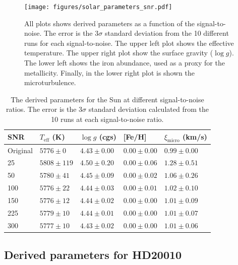 \documentclass{aa}
\begin{document}
\begin{figure}[tbp!]
    \centering
    \texttt{[image: figures/solar\_parameters\_snr.pdf]}
    \caption{All plots shows derived parameters as a function of the
    signal-to-noise. The error is the 3$\sigma$ standard deviation from
    the 10 different runs for each signal-to-noise. The upper left plot
    shows the effective temperature. The upper right plot show the surface
    gravity ($\log g$). The lower left shows the iron abundance, used as a
    proxy for the metallicity. Finally, in the lower right plot is shown
    the microturbulence.}
    \label{fig:snr_sun}
\end{figure}

\begin{table}[htb!]
    \caption{The derived parameters for the Sun at different signal-to-noise
    ratios. The error is the 3$\sigma$ standard deviation calculated from
    the 10 runs at each signal-to-noise ratio.}
    \label{tab:solar_params}
    \centering
    \begin{tabular}{lllll}
      \hline\hline
        SNR & $T_\mathrm{eff}$ (K) & $\log g$ (cgs)  &       [Fe/H]     & $\xi_\mathrm{micro}$ (km/s)  \\
      \hline
  Original  &  $5776 \pm 0$        & $4.43 \pm 0.00$ & $0.00 \pm 0.00$  & $0.99 \pm 0.00$              \\
      \hline
        25  &  $5808 \pm 119$      & $4.50 \pm 0.20$ & $0.00 \pm 0.06$  & $1.28 \pm 0.51$              \\
        50  &  $5780 \pm 41$       & $4.45 \pm 0.09$ & $0.00 \pm 0.02$  & $1.06 \pm 0.26$              \\
       100  &  $5776 \pm 22$       & $4.44 \pm 0.03$ & $0.00 \pm 0.01$  & $1.02 \pm 0.10$              \\
       150  &  $5776 \pm 12$       & $4.44 \pm 0.02$ & $0.00 \pm 0.00$  & $1.01 \pm 0.09$              \\
       225  &  $5779 \pm 10$       & $4.44 \pm 0.01$ & $0.00 \pm 0.00$  & $1.01 \pm 0.07$              \\
       300  &  $5777 \pm 10$       & $4.43 \pm 0.02$ & $0.00 \pm 0.00$  & $1.01 \pm 0.06$              \\
      \hline
    \end{tabular}
\end{table}



\subsection{Derived parameters for HD20010}
\label{sec:derived_parameters_of_hd20010}
\end{document}
